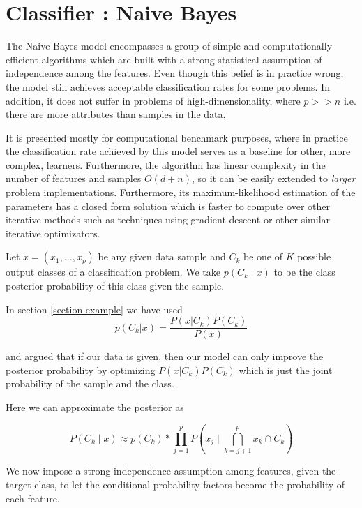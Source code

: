 \section{Classifier : Naive Bayes}

The Naive Bayes model encompasses a group of simple and computationally efficient algorithms which are built with a strong statistical assumption of independence among the features. Even though this belief is in practice wrong, the model still achieves acceptable classification rates for some problems. In addition, it does not suffer in problems of high-dimensionality, where $p >> n$ i.e. there are more attributes than samples in the data.

It is presented mostly for computational benchmark purposes, where in practice the classification rate achieved by this model serves as a baseline for other, more complex, learners. Furthermore, the algorithm has linear complexity in the number of features and samples $O(d+n)$, so it can be easily extended to \textit{larger} problem implementations. Furthermore, its maximum-likelihood estimation of the parameters has a closed form solution which is faster to compute over other iterative methods such as techniques using gradient descent or other similar iterative optimizators.

Let $x = (x_1,...,x_p)$ be any given data sample and $C_k$ be one of $K$ possible output classes of a classification problem. We take $p(C_k \mid x)$ to be the class posterior probability of this class given the sample.

In section \cref{section-example}
we have used
\begin{equation} \label{equation-posteriorProbabilties}
p(C_k| x) = \frac{P(x|C_k)P(C_k)}{P(x)}
\end{equation}


and argued that if our data is given, then our model can only improve the posterior probability by optimizing $P(x|C_k)P(C_k)$ which is just the joint probability of the sample and the class.

Here we can approximate the posterior as

\begin{equation}\label{equation-posteriorProbabilityDecomposition1}
P(C_k \mid x) \approx p(C_k) * \prod_{j=1}^{p}  P(x_j \mid \bigcap_{k=j+1}^{p} x_k \cap C_k)
\end{equation}


We now impose a strong independence assumption among features, given the target class, to let the conditional probability factors become the probability of each feature. %

